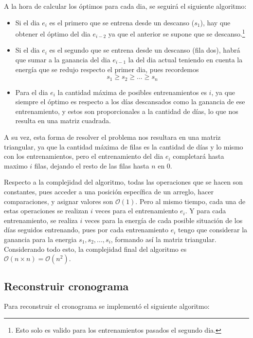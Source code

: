 A la hora de calcular los óptimos para cada dia, se seguirá el siguiente algoritmo:
\begin{itemize}
	\item Si el dia $e_i$ es el primero que se entrena desde un descanso ($s_1$), hay que obtener el óptimo del dia $e_{i-2}$ ya que el anterior se supone que se descanso.\footnote{Esto solo es valido para los entrenamientos pasados el segundo dia.}
	\item Si el dia $e_i$ es el segundo que se entrena desde un descanso (fila dos), habrá que sumar a la ganancia del dia $e_{i-1}$ la del dia actual teniendo en cuenta la energía que se redujo respecto el primer dia, pues recordemos
	\[ s_1 \geq s_2 \geq ... \geq s_n\]
	\item Para el dia $e_i$ la cantidad máxima de posibles entrenamientos es $i$, ya que siempre el óptimo es respecto a los días descansados como la ganancia de ese entrenamiento, y estos son proporcionales a la cantidad de días, lo que nos resulta en una matriz cuadrada.
\end{itemize}

A su vez, esta forma de resolver el problema nos resultara en una matriz triangular, ya que la cantidad máxima de filas es la cantidad de días y lo mismo con los entrenamientos, pero el entrenamiento del dia $e_i$ completará hasta maximo $i$ filas, dejando el resto de las filas hasta $n$ en 0.

Respecto a la complejidad del algoritmo, todas las operaciones que se hacen son constantes, pues acceder a una posición específica de un arreglo, hacer comparaciones, y asignar valores son $\mathcal{O}(1)$. Pero al mismo tiempo, cada una de estas operaciones se realizan $i$ veces para el entrenamiento $e_i$. Y para cada entrenamiento, se realiza $i$ veces para la energía de cada posible situación de los días seguidos entrenando, pues por cada entrenamiento $e_i$ tengo que considerar la ganancia para la energia $s_1, s_2, ..., s_i$, formando así la matriz triangular. Considerando todo esto, la complejidad final del algoritmo es $\mathcal{O}(n \times n) = \mathcal{O}(n^2)$.

\subsection{Reconstruir cronograma}

Para reconstruir el cronograma se implementó el siguiente algoritmo:



